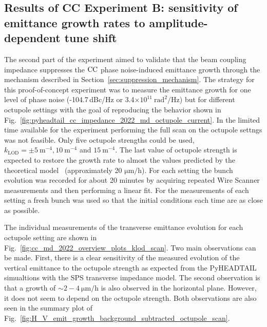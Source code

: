 \subsection{Results of CC Experiment B: sensitivity of emittance growth rates to amplitude-dependent tune shift}\label{subsec:cc_md_2022_octupole_scan}

The second part of the experiment aimed to validate that the beam coupling impedance suppresses the ${\mathrm{CC}}$ phase noise-induced emittance growth through the mechanism described in Section~\ref{sec:suppression_mechanism}. The strategy for this proof-of-concept experiment was to measure the emittance growth for one level of phase noise (-104.7\,dBc/Hz or 3.4$\times 10^{11} \ \mathrm{rad^2/Hz}$) but for different octupole settings with the goal of reproducing the behavior shown in Fig.~\ref{fig:pyheadtail_cc_impedance_2022_md_octupole_current}. In the limited time available for the experiment performing the full scan on the octupole settngs was not feasible. Only five octupole strengths could be used, $k_\mathrm{LOD} = \pm 5 \ \mathrm{m^{-4}}, 10 \ \mathrm{m^{-4}}$ and $15 \ \mathrm{m^{-4}}$. The last value of octupole strength is expected to restore the growth rate to almost the values predicted by the theoretical model~\cite{PhysRevSTAB.18.101001} (approximately 20 $\mathrm{\mu m/h}$). For each setting the bunch evolution was recorded for about 20 minutes by acquiring repeated Wire Scanner measurements and then performing a linear fit. For the measurements of each setting a fresh bunch was used so that the initial conditions each time are as close as possible.

The individual measurements of the transverse emittance evolution for each octupole setting are shown in Fig.~\ref{fig:cc_md_2022_overview_plots_klod_scan}. Two main observations can be made. First, there is a clear sensitivity of the measured evolution of the vertical emittance to the octupole strength as expected from the PyHEADTAIL simualtions with the SPS transverse impedance model. The second observation is that a growth of $\sim 2-4 \ \mathrm{\mu m/h}$ is also observed in the horizontal plane. However, it does not seem to depend on the octupole strength. Both observations are also seen in the summary plot of Fig.~\ref{fig:H_V_emit_growth_background_subtracted_octupole_scan}.


